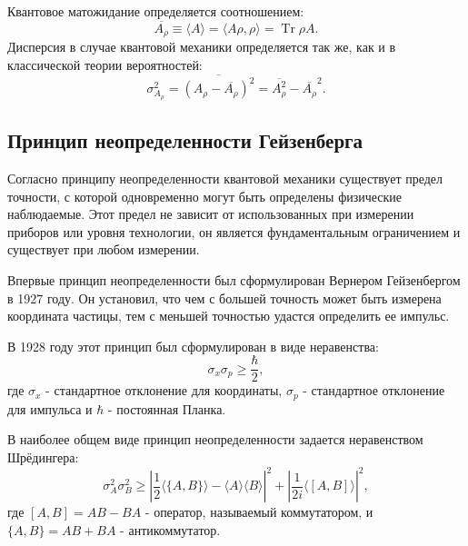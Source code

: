 \documentclass[%
master,         %
subf,           %
href,           %
,times         %
]{disser}
\DeclareMathOperator{\Tr}{Tr}
\numberwithin{equation}{section}
\numberwithin{figure}{section}
\begin{document}
Квантовое матожидание определяется соотношением:
\[
\overline{A_\rho} \equiv \langle A\rangle = \langle A\rho, \rho\rangle = \Tr\rho A.
\]
Дисперсия в случае квантовой механики определяется так же, как и в классической теории вероятностей:
\[
\sigma^2_{A_\rho} = \overline{\left(A_\rho - \overline{A_\rho}\right)^2} = \overline{A^2_\rho} - \overline{A_\rho}^2.
\] 

\subsection{Принцип неопределенности Гейзенберга}
Согласно принципу неопределенности квантовой механики существует предел точности, с которой одновременно могут быть определены физические наблюдаемые. Этот предел не зависит от использованных при измерении приборов или уровня технологии, он является фундаментальным ограничением и существует при любом измерении.

Впервые принцип неопределенности был сформулирован Вернером Гейзенбергом в 1927 году. Он установил, что чем с большей точность может быть измерена координата частицы, тем с меньшей точностью удастся определить ее импульс.

В 1928 году этот принцип был сформулирован в виде неравенства:
\[
\sigma_x\sigma_p \geq \frac{\hbar}{2},
\]
где $\sigma_x$  - стандартное отклонение для координаты, $\sigma_p$ - стандартное отклонение для импульса и $\hbar$ - постоянная Планка.

В наиболее общем виде принцип неопределенности задается неравенством Шрёдингера:
\begin{equation}
\sigma_A^2\sigma_B^2 \geq \left| \frac{1}{2}\langle\{A, B\}\rangle - \langle A\rangle\langle B\rangle \right|^2 + \left| \frac{1}{2i}\langle [A, B]\rangle\right|^2,
\label{eq:Schrodinger_ineq}
\end{equation}
где $[A, B] = AB - BA$ - оператор, называемый коммутатором, и $\{A, B\} = AB + BA$ - антикоммутатор.
\end{document}
